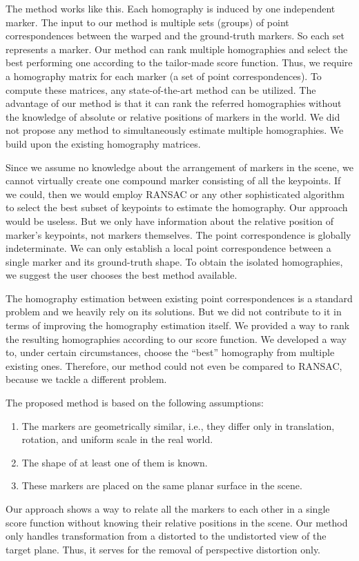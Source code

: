 The method works like this. Each homography is induced by one independent marker. The input to our method is multiple sets (groups) of point correspondences between the warped and the ground-truth markers. So each set represents a marker. Our method can rank multiple homographies and select the best performing one according to the tailor-made score function. Thus, we require a homography matrix for each marker (a set of point correspondences). To compute these matrices, any state-of-the-art method can be utilized. The advantage of our method is that it can rank the referred homographies without the knowledge of absolute or relative positions of markers in the world. We did not propose any method to simultaneously estimate multiple homographies. We build upon the existing homography matrices.

Since we assume no knowledge about the arrangement of markers in the scene, we cannot virtually create one compound marker consisting of all the keypoints. If we could, then we would employ RANSAC or any other sophisticated algorithm to select the best subset of keypoints to estimate the homography. Our approach would be useless. But we only have information about the relative position of marker’s keypoints, not markers themselves. The point correspondence is globally indeterminate. We can only establish a local point correspondence between a single marker and its ground-truth shape. To obtain the isolated homographies, we suggest the user chooses the best method available. 

The homography estimation between existing point correspondences is a standard problem and we heavily rely on its solutions. But we did not contribute to it in terms of improving the homography estimation itself. We provided a way to rank the resulting homographies according to our score function. We developed a way to,
under certain circumstances, choose the ``best'' homography from multiple existing ones. Therefore, our method could not even be compared to RANSAC, because we tackle a different problem.

The proposed method is based on the following assumptions:
\begin{enumerate}
    \item The markers are geometrically similar, i.e., they differ only in translation, rotation, and uniform scale in the real world.
    \item The shape of at least one of them is known.
    \item These markers are placed on the same planar surface in the scene.
\end{enumerate}
Our approach shows a way to relate all the markers to each other in a single score function without knowing their relative positions in the scene. Our method only handles transformation from a distorted to the undistorted view of the target plane. Thus, it serves for the removal of perspective distortion only.

